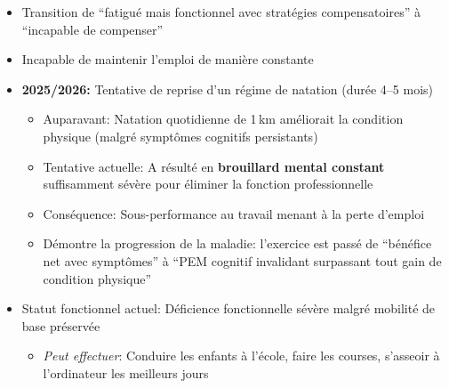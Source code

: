 \begin{description}
\begin{itemize}
\begin{itemize}
\begin{itemize}
                \item L'acide lactique élevé à la baseline supporte l'hypothèse de dysfonction métabolique
                \item Les syncopes vagales récurrentes sont cohérentes avec la dysautonomie
                \item Le pattern d'hypersensibilité vagale peut représenter une vulnérabilité autonome préexistante
                \item Le syndrome post-commotionnel partage des caractéristiques avec l'EM/SFC: dysfonction cognitive, fatigue, intolérance à l'exercice
                \item Le TCC peut déclencher ou exacerber la dysfonction neuroimmunitaire
                \item Chronologie: 6 mois après le déclencheur du burnout, durant la phase de détérioration précoce
            \end{itemize}
        \end{itemize}
        \item Transition de ``fatigué mais fonctionnel avec stratégies compensatoires'' à ``incapable de compenser''
        \item Incapable de maintenir l'emploi de manière constante
        \item \textbf{2025/2026:} Tentative de reprise d'un régime de natation (durée 4--5 mois)
        \begin{itemize}
            \item Auparavant: Natation quotidienne de 1\,km améliorait la condition physique (malgré symptômes cognitifs persistants)
            \item Tentative actuelle: A résulté en \textbf{brouillard mental constant} suffisamment sévère pour éliminer la fonction professionnelle
            \item Conséquence: Sous-performance au travail menant à la perte d'emploi
            \item Démontre la progression de la maladie: l'exercice est passé de ``bénéfice net avec symptômes'' à ``PEM cognitif invalidant surpassant tout gain de condition physique''
        \end{itemize}
        \item Statut fonctionnel actuel: Déficience fonctionnelle sévère malgré mobilité de base préservée
        \begin{itemize}
            \item \textit{Peut effectuer}: Conduire les enfants à l'école, faire les courses, s'asseoir à l'ordinateur les meilleurs jours

\end{itemize}
\end{itemize}
\end{description}
